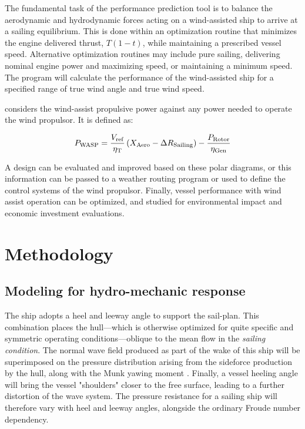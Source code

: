 \documentclass[twoside,twocolumn]{article}
\begin{document}
	The fundamental task of the performance prediction tool is to balance the aerodynamic and hydrodynamic forces acting on a wind-assisted ship to arrive at a sailing equilibrium. This is done within an optimization routine that minimizes the engine delivered thrust, $T(1-t)$, while maintaining a prescribed vessel speed. Alternative optimization routines may include pure sailing, delivering nominal engine power and maximizing speed, or maintaining a minimum speed. The program will calculate the performance of the wind-assisted ship for a specified range of true wind angle and true wind speed. 
	
	\PWASP considers the wind-assist propulsive power against any power needed to operate the wind propulsor. It is defined as:
	
	\begin{equation}
	P_{\mathrm{WASP}}=\frac{V_{\mathrm{ref}}}{\eta_{\mathrm{T}}} \left( X_{\mathrm{Aero}}-\Delta R_{\mathrm{Sailing}} \right) -\frac{P_{\mathrm{Rotor}}}{\eta_{\mathrm{Gen}}}
	\label{eq:Pwasp}
	\end{equation}
	
	A design can be evaluated and improved based on these polar diagrams, or this information can be passed to a weather routing program or used to define the control systems of the wind propulsor. Finally, vessel performance with wind assist operation can be optimized, and studied for environmental impact and economic investment evaluations.
	
	\section{Methodology}
	
	\subsection{Modeling for hydro-mechanic response}
	
	The ship adopts a heel and leeway angle to support the sail-plan. This combination places the hull---which is otherwise optimized for quite specific and symmetric operating conditions---oblique to the mean flow in the \textit{sailing condition}. The normal wave field produced as part of the wake of this ship will be superimposed on the pressure distribution arising from the sideforce production by the hull, along with the Munk yawing moment \cite{Munk1924}. Finally, a vessel heeling angle will bring the vessel "shoulders" closer to the free surface, leading to a further distortion of the wave system. The pressure resistance for a sailing ship will therefore vary with heel and leeway angles, alongside the ordinary Froude number dependency.
	
\end{document}
